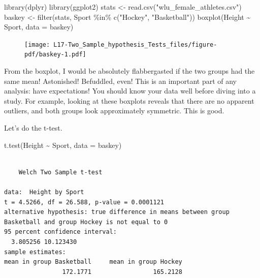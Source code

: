 \documentclass[
  letterpaper,
  DIV=11,
  numbers=noendperiod,
  oneside]{scrreprt}
\newenvironment{Shaded}{\begin{snugshade}}{\end{snugshade}}
\newcommand{\AttributeTok}[1]{\textcolor[rgb]{0.40,0.45,0.13}{#1}}
\newcommand{\FunctionTok}[1]{\textcolor[rgb]{0.28,0.35,0.67}{#1}}
\newcommand{\NormalTok}[1]{\textcolor[rgb]{0.00,0.23,0.31}{#1}}
\newcommand{\OtherTok}[1]{\textcolor[rgb]{0.00,0.23,0.31}{#1}}
\newcommand{\SpecialCharTok}[1]{\textcolor[rgb]{0.37,0.37,0.37}{#1}}
\newcommand{\StringTok}[1]{\textcolor[rgb]{0.13,0.47,0.30}{#1}}
\begin{document}
\begin{Shaded}
\begin{Highlighting}[]
\FunctionTok{library}\NormalTok{(dplyr)}
\FunctionTok{library}\NormalTok{(ggplot2)}
\NormalTok{stats }\OtherTok{\textless{}{-}} \FunctionTok{read.csv}\NormalTok{(}\StringTok{"wlu\_female\_athletes.csv"}\NormalTok{)}
\NormalTok{baskey }\OtherTok{\textless{}{-}} \FunctionTok{filter}\NormalTok{(stats, Sport }\SpecialCharTok{\%in\%} \FunctionTok{c}\NormalTok{(}\StringTok{"Hockey"}\NormalTok{, }\StringTok{"Basketball"}\NormalTok{))}
\FunctionTok{boxplot}\NormalTok{(Height }\SpecialCharTok{\textasciitilde{}}\NormalTok{ Sport, }\AttributeTok{data =}\NormalTok{ baskey)}
\end{Highlighting}
\end{Shaded}

\begin{figure}[H]

{\centering \texttt{[image: L17-Two\_Sample\_hypothesis\_Tests\_files/figure-pdf/baskey-1.pdf]}

}

\end{figure}

From the boxplot, I would be absolutely flabbergasted if the two groups
had the same mean! Astonished! Befuddled, even! This is an important
part of any analysis: have expectations! You should know your data well
before diving into a study. For example, looking at these boxplots
reveals that there are no apparent outliers, and both groups look
approximately symmetric. This is good.

Let's do the t-test.

\begin{Shaded}
\begin{Highlighting}[]
\FunctionTok{t.test}\NormalTok{(Height }\SpecialCharTok{\textasciitilde{}}\NormalTok{ Sport, }\AttributeTok{data =}\NormalTok{ baskey)}
\end{Highlighting}
\end{Shaded}

\begin{verbatim}

    Welch Two Sample t-test

data:  Height by Sport
t = 4.5266, df = 26.588, p-value = 0.0001121
alternative hypothesis: true difference in means between group Basketball and group Hockey is not equal to 0
95 percent confidence interval:
  3.805256 10.123430
sample estimates:
mean in group Basketball     mean in group Hockey 
                172.1771                 165.2128 
\end{verbatim}
\end{document}
